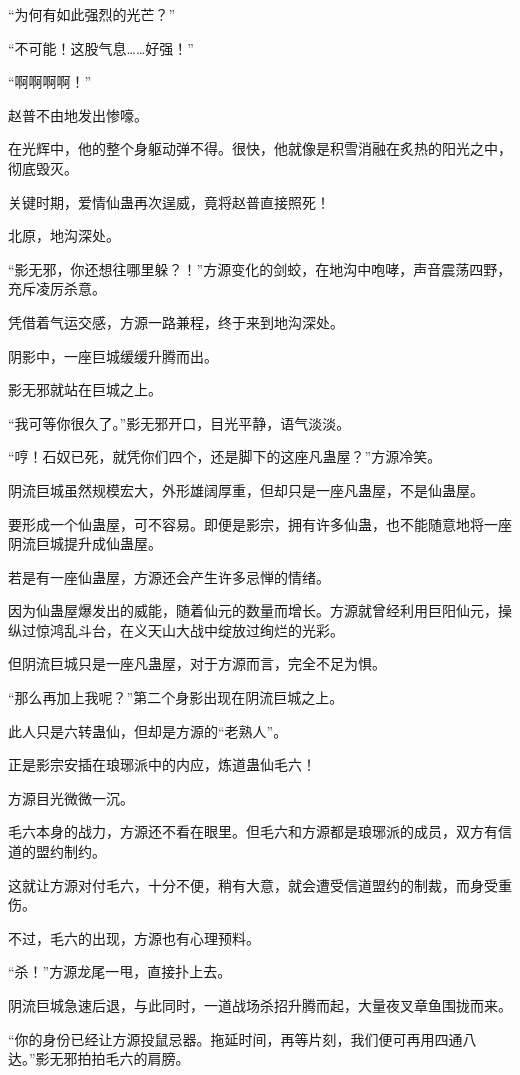 \begin{this_body}
“为何有如此强烈的光芒？”

“不可能！这股气息……好强！”

“啊啊啊啊！”

赵普不由地发出惨嚎。

在光辉中，他的整个身躯动弹不得。很快，他就像是积雪消融在炙热的阳光之中，彻底毁灭。

关键时期，爱情仙蛊再次逞威，竟将赵普直接照死！

北原，地沟深处。

“影无邪，你还想往哪里躲？！”方源变化的剑蛟，在地沟中咆哮，声音震荡四野，充斥凌厉杀意。

凭借着气运交感，方源一路兼程，终于来到地沟深处。

阴影中，一座巨城缓缓升腾而出。

影无邪就站在巨城之上。

“我可等你很久了。”影无邪开口，目光平静，语气淡淡。

“哼！石奴已死，就凭你们四个，还是脚下的这座凡蛊屋？”方源冷笑。

阴流巨城虽然规模宏大，外形雄阔厚重，但却只是一座凡蛊屋，不是仙蛊屋。

要形成一个仙蛊屋，可不容易。即便是影宗，拥有许多仙蛊，也不能随意地将一座阴流巨城提升成仙蛊屋。

若是有一座仙蛊屋，方源还会产生许多忌惮的情绪。

因为仙蛊屋爆发出的威能，随着仙元的数量而增长。方源就曾经利用巨阳仙元，操纵过惊鸿乱斗台，在义天山大战中绽放过绚烂的光彩。

但阴流巨城只是一座凡蛊屋，对于方源而言，完全不足为惧。

“那么再加上我呢？”第二个身影出现在阴流巨城之上。

此人只是六转蛊仙，但却是方源的“老熟人”。

正是影宗安插在琅琊派中的内应，炼道蛊仙毛六！

方源目光微微一沉。

毛六本身的战力，方源还不看在眼里。但毛六和方源都是琅琊派的成员，双方有信道的盟约制约。

这就让方源对付毛六，十分不便，稍有大意，就会遭受信道盟约的制裁，而身受重伤。

不过，毛六的出现，方源也有心理预料。

“杀！”方源龙尾一甩，直接扑上去。

阴流巨城急速后退，与此同时，一道战场杀招升腾而起，大量夜叉章鱼围拢而来。

“你的身份已经让方源投鼠忌器。拖延时间，再等片刻，我们便可再用四通八达。”影无邪拍拍毛六的肩膀。


\end{this_body}
